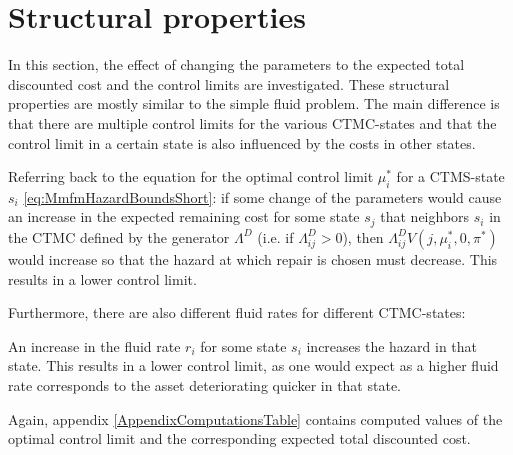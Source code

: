 \section{Structural properties}\label{section:MmfmStructuralProperties}
In this section, the effect of changing the parameters to the expected total discounted cost and the control limits are investigated.
These structural properties are mostly similar to the simple fluid problem.
The main difference is that there are multiple control limits for the various CTMC-states and that the control limit in a certain state is also influenced by the costs in other states.

\begin{remark}
	Referring back to the equation for the optimal control limit $\mu_i^*$ for a CTMS-state $s_i$ \eqref{eq:MmfmHazardBoundsShort}: if some change of the parameters would cause an increase in the expected remaining cost for some state $s_j$ that neighbors $s_i$ in the CTMC defined by the generator $\Lambda^D$ (i.e. if $\Lambda^D_{ij}>0$), then $\Lambda^D_{ij}V(j,\mu_i^*,0,\pi^*)$ would increase so that the hazard at which repair is chosen must decrease.
	This results in a lower control limit.
\end{remark}

Furthermore, there are also different fluid rates for different CTMC-states:
\begin{remark}
	An increase in the fluid rate $r_i$ for some state $s_i$ increases the hazard in that state.
	This results in a lower control limit, as one would expect as a higher fluid rate corresponds to the asset deteriorating quicker in that state.
\end{remark}

Again, appendix \ref{AppendixComputationsTable} contains computed values of the optimal control limit and the corresponding expected total discounted cost.